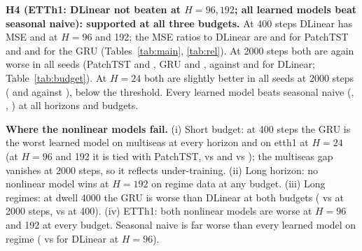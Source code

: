\textbf{H4 (ETTh1: DLinear not beaten at $H=96,192$; all learned models beat seasonal naive): supported at all three budgets.} At 400 steps DLinear has MSE  and  at $H=96$ and 192; the MSE ratios to DLinear are  and  for PatchTST and  and  for the GRU (Tables~\ref{tab:main}, \ref{tab:rel}). At 2000 steps both are again worse in all seeds (PatchTST  and , GRU  and , against  and  for DLinear; Table~\ref{tab:budget}). At $H=24$ both are slightly better in all seeds at 2000 steps ( and  against ), below the threshold. Every learned model beats seasonal naive (, , ) at all horizons and budgets.

\textbf{Where the nonlinear models fail.} (i) Short budget: at 400 steps the GRU is the worst learned model on multiseas at every horizon and on etth1 at $H=24$ (at $H=96$ and 192 it is tied with PatchTST,  vs  and  vs ); the multiseas gap vanishes at 2000 steps, so it reflects under-training. (ii) Long horizon: no nonlinear model wins at $H=192$ on regime data at any budget. (iii) Long regimes: at dwell 4000 the GRU is worse than DLinear at both budgets ( vs  at 2000 steps,  vs  at 400). (iv) ETTh1: both nonlinear models are worse at $H=96$ and 192 at every budget. Seasonal naive is far worse than every learned model on regime ( vs  for DLinear at $H=96$).
